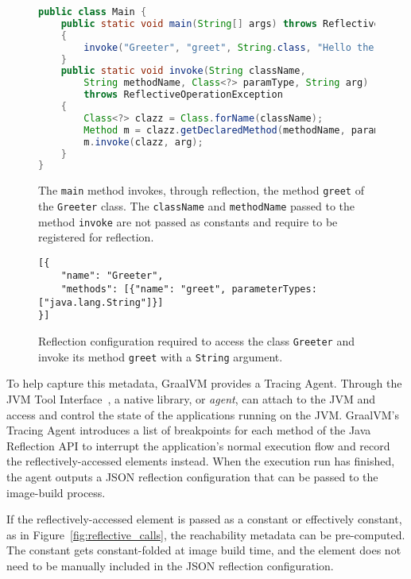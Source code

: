 \begin{figure}[ht]
    \centering
\begin{lstlisting}[language=Java]
public class Main {
    public static void main(String[] args) throws ReflectiveOperationException 
    {
        invoke("Greeter", "greet", String.class, "Hello there!");
    }   
    public static void invoke(String className, 
        String methodName, Class<?> paramType, String arg) 
        throws ReflectiveOperationException 
    {
        Class<?> clazz = Class.forName(className);
        Method m = clazz.getDeclaredMethod(methodName, paramType);
        m.invoke(clazz, arg);
    }
}
\end{lstlisting}
    \caption{The \texttt{main} method invokes, through reflection, the method \texttt{greet} of the \texttt{Greeter} class. The \texttt{className} and \texttt{methodName} passed to the method \texttt{invoke} are not passed as constants and require to be registered for reflection.}
    \label{fig:reflective_calls_invoke}
\end{figure}

\begin{figure}[ht]
    \centering
\begin{lstlisting}
[{
    "name": "Greeter",
    "methods": [{"name": "greet", parameterTypes: ["java.lang.String"]}]
}]    
\end{lstlisting}
    \caption{Reflection configuration required to access the class \texttt{Greeter} and invoke its method \texttt{greet} with a \texttt{String} argument.}
    \label{fig:reflect_config}
\end{figure}

To help capture this metadata, GraalVM provides a Tracing Agent. Through the JVM Tool Interface~\cite{noauthor_jvmtm_nodate}, a native library, or \emph{agent}, can attach to the JVM and access and control the state of the applications running on the JVM. GraalVM's Tracing Agent introduces a list of breakpoints for each method of the Java Reflection API to interrupt the application's normal execution flow and record the reflectively-accessed elements instead. When the execution run has finished, the agent outputs a JSON reflection configuration that can be passed to the image-build process.

If the reflectively-accessed element is passed as a constant or effectively constant, as in Figure~\ref{fig:reflective_calls}, the reachability metadata can be pre-computed. The constant gets constant-folded at image build time, and the element does not need to be manually included in the JSON reflection configuration.

